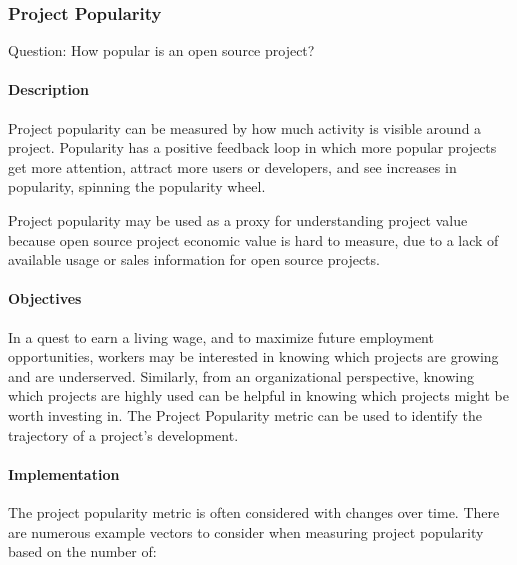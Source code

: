 \hypertarget{project-popularity}{%
\subsubsection{Project Popularity}\label{project-popularity}}

Question: How popular is an open source project?

\hypertarget{description}{%
\paragraph{Description}\label{description}}

Project popularity can be measured by how much activity is visible
around a project. Popularity has a positive feedback loop in which more
popular projects get more attention, attract more users or developers,
and see increases in popularity, spinning the popularity wheel.

Project popularity may be used as a proxy for understanding project
value because open source project economic value is hard to measure, due
to a lack of available usage or sales information for open source
projects.

\hypertarget{objectives}{%
\paragraph{Objectives}\label{objectives}}

In a quest to earn a living wage, and to maximize future employment
opportunities, workers may be interested in knowing which projects are
growing and are underserved. Similarly, from an organizational
perspective, knowing which projects are highly used can be helpful in
knowing which projects might be worth investing in. The Project
Popularity metric can be used to identify the trajectory of a project's
development.

\hypertarget{implementation}{%
\paragraph{Implementation}\label{implementation}}

The project popularity metric is often considered with changes over
time. There are numerous example vectors to consider when measuring
project popularity based on the number of:

